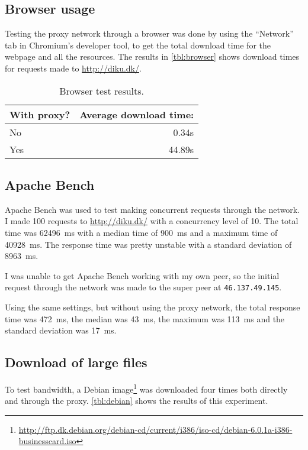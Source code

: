 \documentclass{sig-alternate}
\begin{document}
\subsection{Browser usage}
\label{sec:browser}

Testing the proxy network through a browser was done by using the ``Network''
tab in Chromium's developer tool, to get the total download time for the
webpage and all the resources. The results in \autoref{tbl:browser} shows
download times for requests made to \url{http://diku.dk/}.

\begin{table}[h]
\centering
\begin{tabular}{|l||r|}
\hline
\bf{With proxy?} & \bf{Average download time:} \\
\hline\hline
No & 0.34s \\ \hline
Yes & 44.89s \\
\hline
\end{tabular}
\caption{Browser test results.}
\label{tbl:browser}
\end{table}


\subsection{Apache Bench}
\label{sec:ab}

Apache Bench was used to test making concurrent requests through the network.
I made 100 requests to \url{http://diku.dk/} with a concurrency level of 10.
The total time was 62496~ms with a median time of 900~ms and a maximum time of
40928~ms. The response time was pretty unstable with a standard deviation of
8963~ms.

I was unable to get Apache Bench working with my own peer, so the
initial request through the network was made to the super peer at
\texttt{46.137.49.145}.

Using the same settings, but without using the proxy network, the total
response time was 472~ms, the median was 43~ms, the maximum was 113~ms and the
standard deviation was 17~ms.


\subsection{Download of large files}
\label{sec:debian}

To test bandwidth, a Debian
image\footnote{\url{http://ftp.dk.debian.org/debian-cd/current/i386/iso-cd/debian-6.0.1a-i386-businesscard.iso}}
was downloaded four times both directly and through the proxy.
\autoref{tbl:debian} shows the results of this experiment.
\end{document}
